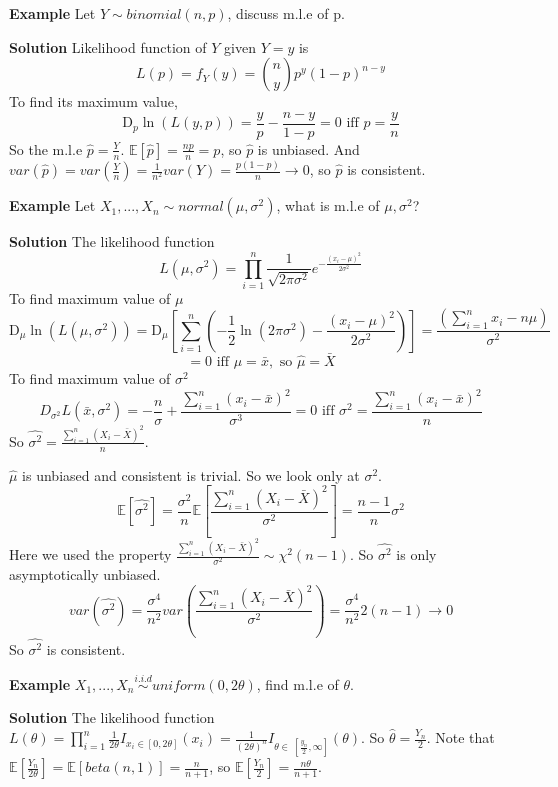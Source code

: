 \documentclass[a4paper,12pt]{article}
\begin{document}
\textbf{Example} Let $Y \sim binomial(n, p)$, discuss m.l.e of p. 

\textbf{Solution} Likelihood function of $Y$ given $Y=y $ is
$$L(p) = f_Y(y) = {n \choose y}p^y(1-p)^{n-y}$$
To find its maximum value, 
$$\mathrm{D}_p \ln( L(y, p) ) = \frac{y}{p} - \frac{n-y}{1-p} = 0 \text{ iff } p = \frac{y}{n}$$
So the m.l.e $\hat{p} = \frac{Y}{n}$. $\mathbb{E}[\hat{p}] = \frac{np}{n} = p$, so $\hat{p}$ is unbiased. 
And $var(\hat{p}) = var(\frac{Y}{n}) = \frac{1}{n^2}var(Y) = \frac{p(1-p)}{n} \to 0$, so $\hat{p}$ is consistent. 

\textbf{Example} Let $X_1, ..., X_n \sim normal(\mu, \sigma^2)$, what is m.l.e of $\mu, \sigma^2$? 

\textbf{Solution} The likelihood function $$L(\mu, \sigma^2) = \prod_{i=1}^n \frac{1}{\sqrt{2\pi \sigma^2}}e^{-\frac{(x_i-\mu)^2}{2\sigma^2}}$$
To find maximum value of $\mu$
$$\mathrm{D}_\mu \ln( L(\mu, \sigma^2) ) =  \mathrm{D}_\mu [\sum_{i=1}^n (-\frac{1}{2}\ln(2\pi\sigma^2) - \frac{(x_i-\mu)^2}{2\sigma^2} )] = \frac{(\sum_{i=1}^n x_i-n\mu)}{\sigma^2}$$
$$= 0 \text{ iff } \mu = \bar{x}, \text{ so } \hat{\mu} = \bar{X}$$
To find maximum value of $\sigma^2$
$$D_{\sigma^2} L(\bar{x}, \sigma^2) = -\frac{n}{\sigma} + \frac{\sum_{i=1}^n(x_i - \bar{x})^2}{\sigma^3} = 0 \text{ iff } \sigma^2 = \frac{\sum_{i=1}^n(x_i - \bar{x})^2}{n}$$
So $\hat{\sigma^2} = \frac{\sum_{i=1}^n(X_i - \bar{X})^2}{n}$. 

$\hat{\mu}$ is unbiased and consistent is trivial. So we look only at $\sigma^2$.
$$\mathbb{E}[\hat{\sigma^2}] = \frac{\sigma^2}{n}\mathbb{E}[\frac{\sum_{i=1}^n(X_i - \bar{X})^2}{\sigma^2}] = \frac{n-1}{n} \sigma^2$$
Here we used the property $\frac{\sum_{i=1}^n(X_i - \bar{X})^2}{\sigma^2} \sim \chi^2(n-1)$. So $\hat{\sigma^2}$ is only asymptotically unbiased.
$$var(\hat{\sigma^2}) = \frac{\sigma^4}{n^2} var( \frac{\sum_{i=1}^n(X_i - \bar{X})^2}{\sigma^2} ) = \frac{\sigma^4}{n^2}2(n-1) \to 0$$
So $\hat{\sigma^2}$ is consistent. 

\textbf{Example} $X_1, ..., X_n \overset{i.i.d}{\sim} uniform(0, 2\theta)$, find m.l.e of $\theta$. 

\textbf{Solution} The likelihood function $L(\theta) = \prod_{i=1}^n \frac{1}{2\theta}I_{x_i\in[0, 2\theta]}(x_i) = \frac{1}{(2\theta)^n}I_{\theta\in\ [\frac{y_n}{2}, \infty]}(\theta)$. So $\hat{\theta} = \frac{Y_n}{2}$. Note that $\mathbb{E}[\frac{Y_n}{2\theta}] = \mathbb{E}[ beta(n, 1) ] = \frac{n}{n+1}$, so $\mathbb{E}[\frac{Y_n}{2}] = \frac{n\theta}{n+1}$. 
\end{document}
